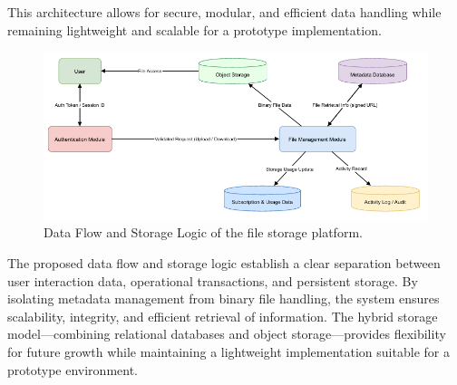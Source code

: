 This architecture allows for secure, modular, and efficient data handling while remaining lightweight and scalable for a prototype implementation.

\begin{figure}[H]
    \centering
    \includegraphics[width=0.9\linewidth,keepaspectratio]{initialdbarch/DataFlow.png}
    \caption{Data Flow and Storage Logic of the file storage platform.}
    \label{fig:Dataflow}
\end{figure}

The proposed data flow and storage logic establish a clear separation between user interaction data, operational transactions, and persistent storage. By isolating metadata management from binary file handling, the system ensures scalability, integrity, and efficient retrieval of information. The hybrid storage model—combining relational databases and object storage—provides flexibility for future growth while maintaining a lightweight implementation suitable for a prototype environment.
